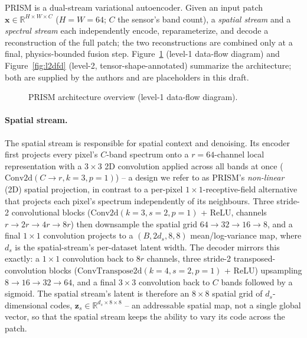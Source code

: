 \documentclass{article} %
\begin{document}
PRISM is a dual-stream variational autoencoder. Given an input patch $\mathbf{x} \in \mathbb{R}^{H \times W \times C}$ ($H=W=64$; $C$ the sensor's band count), a \emph{spatial stream} and a \emph{spectral stream} each independently encode, reparameterize, and decode a reconstruction of the full patch; the two reconstructions are combined only at a final, physics-bounded fusion step. Figure~\ref{fig:l1dfd} (level-1 data-flow diagram) and Figure~\ref{fig:l2dfd} (level-2, tensor-shape-annotated) summarize the architecture; both are supplied by the authors and are placeholders in this draft.

\begin{figure}[t]
\centering
{}
\caption{PRISM architecture overview (level-1 data-flow diagram).}
\label{fig:l1dfd}
\end{figure}

\paragraph{Spatial stream.} The spatial stream is responsible for spatial context and denoising. Its encoder first projects every pixel's $C$-band spectrum onto a $r{=}64$-channel local representation with a $3{\times}3$ 2D convolution applied across all bands at once ($\mathrm{Conv2d}(C{\to}r, k{=}3, p{=}1)$) -- a design we refer to as PRISM's \emph{non-linear} (2D) spatial projection, in contrast to a per-pixel $1{\times}1$-receptive-field alternative that projects each pixel's spectrum independently of its neighbours. Three stride-2 convolutional blocks ($\mathrm{Conv2d}(k{=}3,s{=}2,p{=}1)$ + ReLU, channels $r{\to}2r{\to}4r{\to}8r$) then downsample the spatial grid $64{\to}32{\to}16{\to}8$, and a final $1{\times}1$ convolution projects to a $(B, 2d_s, 8, 8)$ mean/log-variance map, where $d_s$ is the spatial-stream's per-dataset latent width. The decoder mirrors this exactly: a $1{\times}1$ convolution back to $8r$ channels, three stride-2 transposed-convolution blocks ($\mathrm{ConvTranspose2d}(k{=}4,s{=}2,p{=}1)$ + ReLU) upsampling $8{\to}16{\to}32{\to}64$, and a final $3{\times}3$ convolution back to $C$ bands followed by a sigmoid. The spatial stream's latent is therefore an $8{\times}8$ spatial grid of $d_s$-dimensional codes, $\mathbf{z}_s \in \mathbb{R}^{d_s \times 8 \times 8}$ -- an addressable spatial map, not a single global vector, so that the spatial stream keeps the ability to vary its code across the patch.
\end{document}

